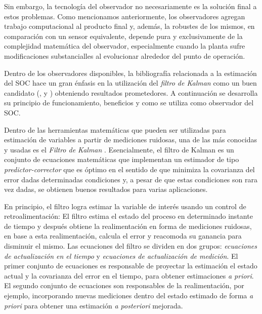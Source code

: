 \documentclass[10pt,a4paper]{article}
\newcounter{subsubsubsection}[subsubsection]
\begin{document}
\noindent Sin embargo, la tecnolog\'ia del observador no necesariamente es la
soluci\'on final a estos problemas. Como mencionamos anteriormente, los
observadores agregan trabajo computacional al producto final y, adem\'as, la
robustes de los mismos, en comparación con un sensor equivalente, depende pura y
exclusivamente de la complejidad matemática del observador, especialmente cuando
la planta sufre modificaciones substancialles al evolucionar alrededor del punto
de operaci\'on. 

\noindent Dentro de los observadores disponibles, la bibliograf\'ia relacionada
a la estimaci\'on del \acrshort{SOC} hace un gran \'enfasis en la utilizaci\'on
del \emph{filtro de Kalman} como un buen candidato (\cite{spagnol_kalman}, 
\cite{zhihao_kalman} y \cite{atsushi_kalman}) obteniendo resultados
prometedores. A continuaci\'on se desarrolla su principio de funcionamiento, 
beneficios y como se utiliza como observador del \acrshort{SOC}.

\label{kalmanFilterMethod}

\noindent Dentro de las herramientas matem\'aticas que pueden ser utilizadas 
para estimaci\'on de variables a partir de mediciones ruidosas, una de las m\'as
conocidas y usadas es el \emph{Filtro de Kalman} \cite{kalman_filter_paper}. 
Esencialmente, el filtro de Kalman es un conjunto de ecuaciones matem\'aticas 
que implementan un estimador de tipo \emph{predictor-corrector} que es \'optimo 
en el sentido de que minimiza la covarianza del error dadas determinadas 
condiciones y, a pesar de que estas condiciones son rara vez dadas, se obtienen 
buenos resultados para varias aplicaciones.

\noindent En principio, el filtro logra estimar la variable de inter\'es usando 
un control de retroalimentaci\'on: El filtro estima el estado del proceso en 
determinado instante de tiempo y despu\'es obtiene la realimentaci\'on en forma 
de mediciones ruidosas, en base a esta realimentaci\'on, calcula el error y
reacomoda su ganancia para disminuir el mismo. Las ecuaciones del filtro se
dividen en dos grupos: \emph{ecuaciones de actualizaci\'on en el tiempo} 
y \emph{ecuaciones de actualizaci\'on de medici\'on}. El primer conjunto de
ecuaciones es responsable de proyectar la estimaci\'on el estado actual y la
covarianza del error en el tiempo, para obtener estimaciones \emph{a priori}. 
El segundo conjunto de ecuaciones son responsables de la realimentaci\'on, por 
ejemplo, incorporando nuevas mediciones dentro del estado estimado de forma 
\emph{a priori} para obtener una estimaci\'on \emph{a posteriori} mejorada.
\end{document}
